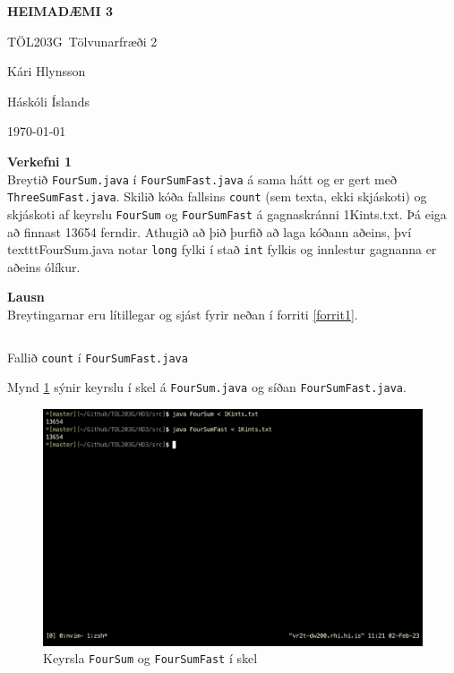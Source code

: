 \documentclass[12pt, a4paper]{article}
\title{}
\newcommand{\doctitle}{\uppercase{Heimadæmi 3}}
\newcommand{\coursename}{Tölvunarfræði 2}
\newcommand{\coursenum}{TÖL203G}
\begin{document}
\thispagestyle{plain}
\centerline{\bfseries\Large\doctitle}
\medskip
\centerline{\large\coursenum\ \coursename}
\bigskip

\centerline{\large Kári Hlynsson}
\bigskip
\centerline{Háskóli Íslands}
\medskip
\centerline{\today}

\bigskip

\noindent
\textbf{\large Verkefni 1} \medskip \\
Breytið \texttt{FourSum.java} í \texttt{FourSumFast.java} á sama hátt og er
gert með \texttt{ThreeSumFast.java}. Skilið kóða fallsins \texttt{count}
(sem texta, ekki skjáskoti) og skjáskoti af keyrslu \texttt{FourSum} og
\texttt{FourSumFast} á gagnaskránni 1Kints.txt. Þá eiga að finnast 13654
ferndir. Athugið að þið þurfið að laga kóðann aðeins, því texttt{FourSum.java}
notar \texttt{long} fylki í stað \texttt{int} fylkis og innlestur gagnanna er aðeins ólíkur.

\medskip
\noindent
\textbf{\large Lausn} \medskip \\
Breytingarnar eru lítillegar og sjást fyrir neðan í forriti \ref{forrit1}.

\begin{listing}[ht!]
    \centering
    \inputminted[firstline=49, lastline=65, linenos]{java}{../src/FourSumFast.java}
    \caption{Fallið \texttt{count} í \texttt{FourSumFast.java}}
    \label{forrit1}
\end{listing}

\noindent
Mynd \ref{mynd1} sýnir keyrslu í skel á \texttt{FourSum.java} og síðan \texttt{FourSumFast.java}.

\begin{figure}[ht!]
   \centering
   \includegraphics[width=\textwidth]{img/foursum_keyrsla.png} 
   \caption{Keyrsla \texttt{FourSum} og \texttt{FourSumFast} í skel}
   \label{mynd1}
\end{figure}
\end{document}

